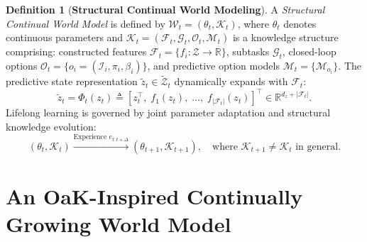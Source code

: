 \documentclass{article}
\theoremstyle{definition}
\newtheorem{definition}{Definition}
\begin{document}
\begin{definition}[\textbf{Structural Continual World Modeling}]
\label{def:scwm}
A \emph{Structural Continual World Model} is defined by $\mathcal{W}_t = (\theta_t, \mathcal{K}_t)$, where $\theta_t$ denotes continuous parameters and $\mathcal{K}_t = (\mathcal{F}_t, \mathcal{G}_t, \mathcal{O}_t, \mathcal{M}_t)$ is a knowledge structure comprising:
constructed features $\mathcal{F}_t = \{f_i: \mathcal{Z} \to \mathbb{R}\}$, subtasks $\mathcal{G}_t$, closed-loop options $\mathcal{O}_t = \{o_i = (\mathcal{I}_i, \pi_i, \beta_i)\}$, and predictive option models $\mathcal{M}_t = \{\mathcal{M}_{o_i}\}$.
The predictive state representation $\tilde{z}_t \in \tilde{\mathcal{Z}}_t$ dynamically expands with $\mathcal{F}_t$:
\begin{equation}
\label{eq:expanded_state}
\tilde{z}_t = \Phi_t(z_t) \triangleq \left[ z_t^\top, \; f_1(z_t), \; \dots, \; f_{|\mathcal{F}_t|}(z_t) \right]^\top \in \mathbb{R}^{d_z + |\mathcal{F}_t|}.
\end{equation}
Lifelong learning is governed by joint parameter adaptation and structural knowledge evolution:
\begin{equation}
\label{eq:structural_transition}
(\theta_t, \mathcal{K}_t) \xrightarrow{\text{Experience } e_{t:t+\Delta}} (\theta_{t+1}, \mathcal{K}_{t+1}), \quad \text{where } \mathcal{K}_{t+1} \neq \mathcal{K}_t \text{ in general}.
\end{equation}
\end{definition}

\section{An OaK-Inspired Continually Growing World Model}
\label{sec:architecture}
\end{document}
